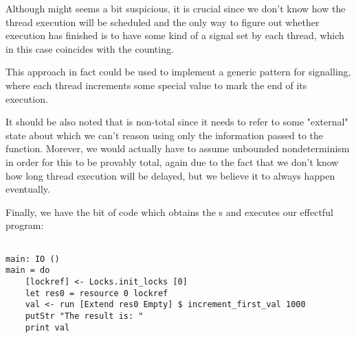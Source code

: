 Although  might seems a bit suspicious, it is crucial
since we don't know how the thread execution will be scheduled and the only way
to figure out whether execution has finished is to have some kind of a signal
set by each thread, which in this case coincides with the counting.

This approach in fact could be used to implement a generic pattern for
signalling, where each thread increments some special value to mark the end of
its execution.

It should be also noted that  is non-total since
it needs to refer to some "external" state about which we can't reason using
only the information passed to the function. Morever, we would actually have to
assume unbounded nondeterminism in order for this to be provably total, again
due to the fact that we don't know how long thread execution will be delayed,
but we believe it to always happen eventually.

Finally, we have the bit of code which obtains the s and executes
our effectful program:

\begin{BVerbatim}

main: IO ()
main = do
    [lockref] <- Locks.init_locks [0]
    let res0 = resource 0 lockref
    val <- run [Extend res0 Empty] $ increment_first_val 1000
    putStr "The result is: "
    print val

\end{BVerbatim}


